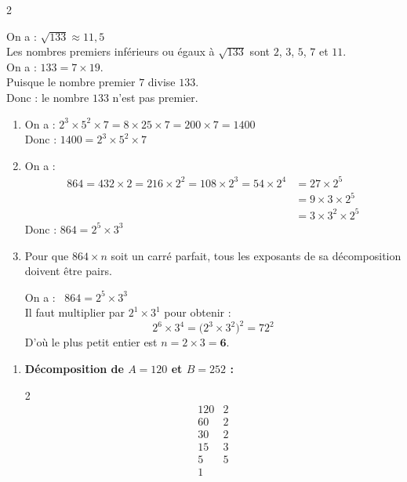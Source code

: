 \documentclass[10pt, a4paper]{article}
\begin{document}
\begin{multicols*}{2}
\begin{Solution}[APPLICATION][8]
\begin{enumerate}[leftmargin=*,itemsep=0.5pt]
    On a : $\sqrt{133} \approx 11,5$ \\
    Les nombres premiers inférieurs ou égaux à $\sqrt{133}$ sont $2$, $3$, $5$, $7$ et $11$. \\
    On a : $133 = 7 \times 19$. \\
    Puisque le nombre premier $7$ divise $133$. \\
    Donc : \quad le nombre $133$ n'est pas premier.
\end{enumerate}
\end{Solution}

\begin{Solution}[ACTIVITÉ][3]
\begin{enumerate}[leftmargin=*,itemsep=0.5pt]
    \item On a :
        $2^3 \times 5^2 \times 7 = 8 \times 25 \times 7
        = 200 \times 7
        = 1400$ \\
    Donc : \quad $1400 = 2^3 \times 5^2 \times 7$

    \item On a :
    \begin{align*}
        864 = 432 \times 2
            = 216 \times 2^2
            = 108 \times 2^3
            = 54 \times 2^4 
            &= 27 \times 2^5 \\
            &= 9  \times 3 \times 2^5 \\
            &= 3  \times 3^2 \times 2^5
    \end{align*}
    Donc : \quad $864 = 2^5 \times 3^3$

    \item Pour que $864 \times n$ soit un carré parfait, tous les exposants de sa décomposition doivent être pairs.

On a :~ $864 = 2^5 \times 3^3$ \\
Il faut multiplier par $2^1 \times 3^1$ pour obtenir :
$$2^6 \times 3^4 = \big(2^3 \times 3^2\big)^2 = 72^2$$ 
D'où le plus petit entier est $n = 2 \times 3 = \mathbf{6}$.
\end{enumerate}
\end{Solution}

\begin{Solution}[APPLICATION][9]
\begin{enumerate}[leftmargin=*,itemsep=0.5pt]
    \item \textbf{Décomposition de $A = 120$ et $B = 252$ :}

    \begin{multicols}{2}
    \[
    \begin{array}{r|l}
    120 & 2 \\
    60  & 2 \\
    30  & 2 \\
    15  & 3 \\
    5   & 5 \\
    1   &
    \end{array}
    \]


\end{multicols}
\end{enumerate}
\end{Solution}
\end{multicols*}
\end{document}
